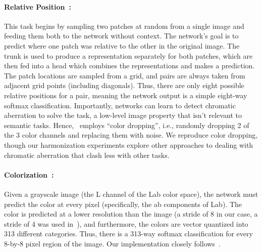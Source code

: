 \documentclass[10pt,twocolumn,letterpaper]{article}
\begin{document}
\paragraph{Relative Position~\cite{doersch2015unsupervised}:} This task begins by sampling two patches at random from a single image and feeding them both to the network without context.  
The network's goal is to predict where one patch was relative to the
other in the original image.  The trunk is used to produce a
representation separately for both patches, which are then fed into a
head which combines the representations and makes a prediction.
The patch locations are sampled from a grid, and pairs are always
taken from adjacent grid points (including diagonals).  Thus, there
are only eight possible relative positions for a pair, meaning the
network output is a simple eight-way softmax classification.
Importantly, networks can learn to detect chromatic aberration to
solve the task, a low-level image property that isn't relevant to
semantic tasks.  Hence,~\cite{doersch2015unsupervised} employs ``color
dropping'', i.e., randomly dropping 2 of the 3 color channels and
replacing them with noise.  We reproduce color dropping, though our
harmonization experiments explore other approaches to dealing with
chromatic aberration that clash less with other tasks.


\paragraph{Colorization~\cite{zhang2016colorful}:} Given a grayscale image (the L channel of the Lab color space), the network must predict the color at every pixel (specifically, the ab components of Lab).
The color is predicted at a lower resolution than the image (a stride
of 8 in our case, a stride of 4 was used in~\cite{zhang2016colorful}), and furthermore, the colors are vector quantized
into 313 different categories.  Thus, there is a 313-way softmax
classification for every 8-by-8 pixel region of the image.  Our
implementation closely follows~\cite{zhang2016colorful}.
\end{document}
